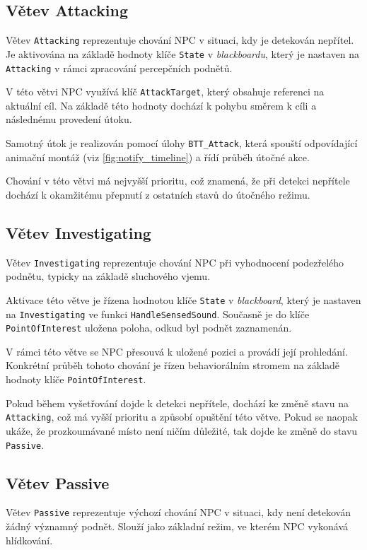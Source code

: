 \subsection{Větev Attacking}

Větev \texttt{Attacking} reprezentuje chování NPC v situaci, kdy je detekován nepřítel.
Je aktivována na základě hodnoty klíče \texttt{State} v \textit{blackboardu}, který je nastaven na \texttt{Attacking}
v rámci zpracování percepčních podnětů.

V této větvi NPC využívá klíč \texttt{AttackTarget}, který obsahuje referenci na aktuální cíl.
Na základě této hodnoty dochází k pohybu směrem k cíli a následnému provedení útoku.

Samotný útok je realizován pomocí úlohy \texttt{BTT\_Attack}, která spouští odpovídající animační montáž (viz \ref{fig:notify_timeline}) a řídí průběh útočné akce.

Chování v této větvi má nejvyšší prioritu, což znamená, že při detekci nepřítele dochází k okamžitému přepnutí z ostatních stavů do útočného režimu.

\subsection{Větev Investigating}

Větev \texttt{Investigating} reprezentuje chování NPC při vyhodnocení podezřelého podnětu,
typicky na základě sluchového vjemu.

Aktivace této větve je řízena hodnotou klíče \texttt{State} v \textit{blackboard},
který je nastaven na \texttt{Investigating} ve funkci \texttt{HandleSensedSound}.
Současně je do klíče \texttt{PointOfInterest} uložena poloha, odkud byl podnět zaznamenán.

V rámci této větve se NPC přesouvá k uložené pozici a provádí její prohledání.
Konkrétní průběh tohoto chování je řízen behaviorálním stromem na základě hodnoty klíče \texttt{PointOfInterest}.

Pokud během vyšetřování dojde k detekci nepřítele, dochází ke změně stavu na \texttt{Attacking}, což má vyšší prioritu a způsobí opuštění této větve.
Pokud se naopak ukáže, že prozkoumávané místo není ničím důležité, tak dojde ke změně do stavu \texttt{Passive}.

\subsection{Větev Passive}

Větev \texttt{Passive} reprezentuje výchozí chování NPC v situaci, kdy není detekován žádný významný podnět.
Slouží jako základní režim, ve kterém NPC vykonává hlídkování.

